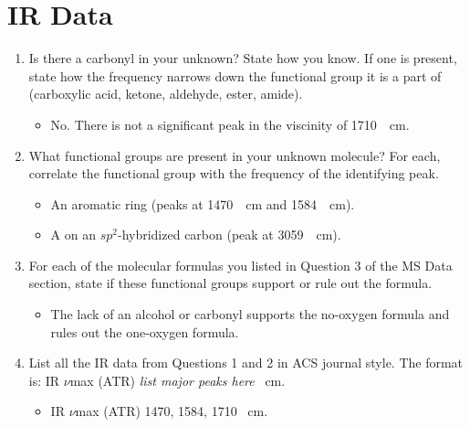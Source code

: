 \documentclass[titlepage]{article}
\begin{document}
\section*{IR Data}
\begin{enumerate}
    \item Is there a carbonyl in your unknown? State how you know. If one is present, state how the frequency narrows down the functional group it is a part of (carboxylic acid, ketone, aldehyde, ester, amide).
    \begin{itemize}
        \item No. There is not a significant peak in the viscinity of \SI{1710}{\per\centi\meter}.
    \end{itemize}
    \item What functional groups are present in your unknown molecule? For each, correlate the functional group with the frequency of the identifying peak.
    \begin{itemize}
        \item An aromatic ring (peaks at \SI{1470}{\per\centi\meter} and \SI{1584}{\per\centi\meter}).
        \item A  on an $sp^2$-hybridized carbon (peak at \SI{3059}{\per\centi\meter}).
    \end{itemize}
    \item For each of the molecular formulas you listed in Question 3 of the MS Data section, state if these functional groups support or rule out the formula.
    \begin{itemize}
        \item The lack of an alcohol or carbonyl supports the no-oxygen formula and rules out the one-oxygen formula.
    \end{itemize}
    \item List all the IR data from Questions 1 and 2 in ACS journal style. The format is: IR $\nu$max (ATR) \emph{list major peaks here} \si{\per\centi\meter}.
    \begin{itemize}
        \item IR $\nu$max (ATR) \num{1470}, \num{1584}, \num{1710} \si{\per\centi\meter}.
    \end{itemize}
\end{enumerate}
\end{document}
